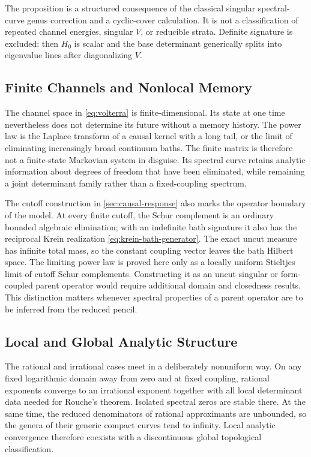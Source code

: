 \documentclass[11pt,reqno]{amsart}
\theoremstyle{remark}
\begin{document}
The proposition is a structured consequence of the classical singular
spectral-curve genus correction and a cyclic-cover calculation.  It is not a
classification of repeated channel energies, singular $V$, or reducible
strata.  Definite signature is excluded: then $H_0$ is scalar and the base
determinant generically splits into eigenvalue lines after diagonalizing
$V$.

\subsection{Finite Channels and Nonlocal Memory}

The channel space in \eqref{eq:volterra} is finite-dimensional.  Its state at
one time nevertheless does not determine its future without a memory
history.  The power law is the Laplace transform of a causal kernel with a
long tail, or the limit of eliminating increasingly broad continuum baths.
The finite matrix is therefore not a finite-state Markovian system in
disguise.  Its spectral curve retains analytic information about degrees of
freedom that have been eliminated, while remaining a joint determinant family
rather than a fixed-coupling spectrum.

The cutoff construction in \cref{sec:causal-response} also marks the operator
boundary of the model.  At every finite cutoff, the Schur complement is an
ordinary bounded algebraic elimination; with an indefinite bath signature it
also has the reciprocal Krein realization \eqref{eq:krein-bath-generator}.
The exact uncut measure has
infinite total mass, so the constant coupling vector leaves the bath Hilbert
space.  The limiting power law is proved here only as a locally uniform
Stieltjes limit of cutoff Schur complements.  Constructing it as an uncut
singular or form-coupled parent operator would require additional domain and
closedness results.  This distinction matters whenever spectral properties of
a parent operator are to be inferred from the reduced pencil.

\subsection{Local and Global Analytic Structure}

The rational and irrational cases meet in a deliberately nonuniform way.
On any fixed logarithmic domain away from zero and at fixed coupling, rational exponents converge
to an irrational exponent together with all local determinant data needed
for Rouche's theorem.  Isolated spectral zeros are stable there.  At the same
time, the reduced denominators of rational approximants are unbounded, so the
genera of their generic compact curves tend to infinity.  Local analytic
convergence therefore coexists with a discontinuous global topological
classification.
\end{document}
